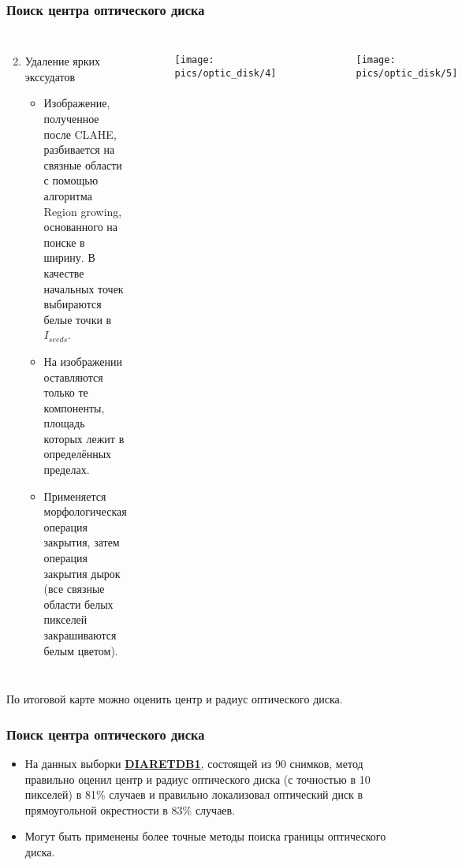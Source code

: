 \documentclass{beamer}
\begin{document}
\begin{frame}[fragile]
	\frametitle{Поиск центра оптического диска}
	
	\begin{columns}[c]
		\begin{enumerate}	
			\setcounter{enumi}{1}
			\item Удаление ярких экссудатов
			\begin{itemize}
				\item Изображение, полученное после CLAHE, разбивается на связные области с помощью алгоритма Region growing, основанного на поиске в ширину. В качестве начальных точек выбираются белые точки в $I_{seeds}$.
				\item На изображении оставляются только те компоненты, площадь которых лежит в определённых пределах.
				\item Применяется морфологическая операция закрытия, затем операция закрытия дырок (все связные области белых пикселей закрашиваются белым цветом).
			\end{itemize}
		\end{enumerate}
		
			\begin{figure}
			\centering
			\texttt{[image: pics/optic\_disk/4]}
			\label{fig:4}
			\end{figure}
			\begin{figure}
			\centering
			\texttt{[image: pics/optic\_disk/5]}
			\label{fig:5}
			\end{figure}
	\end{columns}
	\vspace{0.3cm}
	По итоговой карте можно оценить центр и радиус оптического диска.
\end{frame}

\begin{frame}
	\frametitle{Поиск центра оптического диска}
	\begin{itemize}
		\item На данных выборки \href{http://www.it.lut.fi/project/imageret/diaretdb1/}{\textbf{DIARETDB1}}, состоящей из 90 снимков, метод правильно оценил центр и радиус оптического диска (с точностью в 10 пикселей) в 81\% случаев и
		правильно локализовал оптический диск в прямоугольной окрестности в 83\% случаев.
		\item Могут быть применены более точные методы поиска границы оптического диска.
	\end{itemize}
	
\end{frame}
\end{document}
